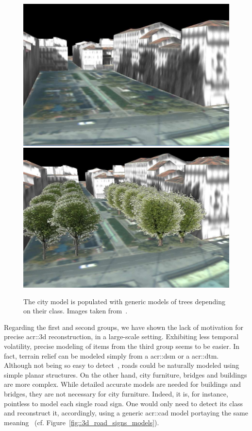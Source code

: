             \begin{figure}[htb]
                \centering
                \includegraphics[width=.45\textwidth]{images/introduction/modeling_trees_1}
                \includegraphics[width=.45\textwidth]{images/introduction/modeling_trees_2}
                \caption[
                    The city model is populated with generic models of trees depending on their class.
                ]{
                    \label{fig::3d_tree_models}
                    The city model is populated with generic models of trees depending on their class.
                    Images taken from~\parencite{iovan2008detection}.
                }
            \end{figure}
            Regarding the first and second groups, we have shown the lack of motivation for precise \gls{acr::3d} reconstruction, in a large-scale setting.
            Exhibiting less temporal volatility, precise modeling of items from the third group seems to be easier.
            In fact, terrain relief can be modeled simply from a \acrfull{acr::dsm} or a \gls{acr::dtm}.
            Although not being so easy to detect~\parencite{mnih2010learning}, roads could be naturally modeled using simple planar structures.
            On the other hand, city furniture, bridges and buildings are more complex.
            While detailed accurate models are needed for buildings and bridges, they are not necessary for city furniture.
            Indeed, it is, for instance, pointless to model each single road sign.
            One would only need to detect its class and reconstruct it, accordingly, using a generic \gls{acr::cad} model portaying the same meaning~\parencite{soheilian2013detection} (cf. Figure~\ref{fig::3d_road_signs_models}).\\
